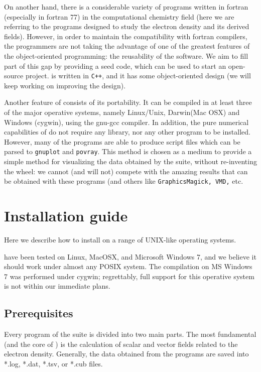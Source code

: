 On another hand, there is a considerable variety of programs written in fortran (especially in
fortran 77) in the computational chemistry field (here we are referring to the programs
designed to study the electron density and its derived fields). However, in order to maintain the
compatibility with fortran compilers, the programmers are not taking the advantage of one of
the greatest features of the object-oriented programming: the reusability of the software.
We aim to fill part of this gap by providing a seed code, which can be used to start an
open-source project. \DTK{} is written in \texttt{C++}, and it has some object-oriented 
design (we will keep working on improving the design).

Another feature of \DTK{} consists of its portability. It can be compiled in at least three of the major
operative systems, namely Linux/Unix, Darwin(Mac OSX) and Windows (cygwin), using the gnu-gcc compiler.
In addition, the pure numerical capabilities of \DTK{} do not require any library, nor any other
program to be installed. However, many of the programs are able to produce script files
which can be parsed to \texttt{gnuplot} and \texttt{povray}. This method is chosen as a
medium to provide a simple method for visualizing the data obtained by the suite, without
re-inventing the wheel: we cannot (and will not) compete with the amazing results that can 
be obtained with these programs (and others like \texttt{GraphicsMagick, VMD,} etc.

\section{Installation guide}

Here we describe how to install \DTK{} on a range of UNIX-like operating systems.

\DTK{} have been tested on Linux, MacOSX, and Microsoft Windows 7, and we believe it should
work under almost any POSIX system. The compilation on MS Windows 7 was performed under cygwin;
regrettably, full support for this operative system is not within our immediate plans.

\subsection{Prerequisites}

Every program of the suite \DTK{} is divided into two main parts. The most fundamental
(and the core of \DTK) is the calculation of scalar and vector fields related to the electron
density. Generally, the data obtained from the programs are saved into *.log, *.dat, *.tsv,
or *.cub files. 

